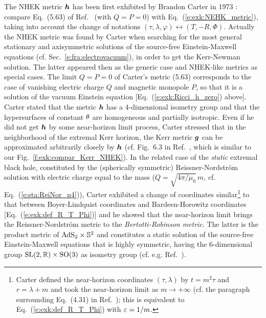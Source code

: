 \begin{hist} \label{h:exk:NHEK_metric}
The NHEK metric $\bm{h}$ has been first exhibited by Brandon Carter in 1973 \cite{Carte73a}:
compare Eq.~(5.63) of Ref.~\cite{Carte73a} (with $Q=P=0$) with Eq.~(\ref{e:exk:NEHK_metric}),
taking into account the change of notations $(\tau,\lambda,\varphi) \leftrightarrow (T,-R,\Phi)$.
Actually the NHEK metric was found by Carter when searching for the most general stationary
and axisymmetric solutions of the source-free Einstein-Maxwell equations (cf. Sec.~\ref{e:fra:electrovacuum}), in order to get
the Kerr-Newman solution. The latter appeared then as the generic case and NHEK-like metrics as
special cases. The limit $Q=P=0$ of Carter's metric (5.63) corresponds to the case
of vanishing electric charge $Q$ and magnetic monopole $P$, so that it is a solution
of the vacuum Einstein equation  [Eq.~(\ref{e:exk:Ricci_h_zero}) above].
Carter stated that the metric $\bm{h}$ has a
4-dimensional isometry group and that the hypersurfaces of constant $\theta$ are
homogeneous and partially isotropic.
Even if he did not get $\bm{h}$ by some near-horizon limit process,
Carter stressed that in the neighborhood of the extremal Kerr horizon,
the Kerr metric $\bm{g}$ can
be approximated arbitrarily closely by $\bm{h}$
(cf. Fig.~6.3 in Ref.~\cite{Carte73a}, which is similar to our Fig.~\ref{f:exk:compar_Kerr_NHEK}).
In the related case of the \emph{static} extremal black hole,
constituted by the (spherically symmetric)
Reissner-Nordström solution
with electric charge equal to the mass ($Q = \sqrt{4\pi/\mu_0}\,m$, cf. Eq.~(\ref{e:sta:ReiNor_n4})), Carter exhibited
a change of coordinates similar\footnote{Carter defined the near-horizon coordinates
$(\tau,\lambda)$ by $t = m^2 \tau$ and $r = \lambda + m$ and took the
near-horizon limit as $m\to +\infty$
(cf. the paragraph surrounding Eq.~(4.31) in Ref.~\cite{Carte73a});
this is equivalent to Eq.~(\ref{e:exk:def_R_T_Phi})
with $\varepsilon = 1/m$.}
to that between Boyer-Lindquist coordinates
and Bardeen-Horowitz coordinates [Eq.~(\ref{e:exk:def_R_T_Phi})] and
he showed that the near-horizon limit brings
the Reissner-Nordström metric to the
\emph{Bertotti-Robinson metric}.
The latter is the product metric of $\mathrm{AdS}_2\times\mathbb{S}^2$ and constitutes a static solution of
the source-free Einstein-Maxwell equations that is highly symmetric, having the 6-dimensional
group $\mathrm{SL}(2,\mathbb{R})\times\mathrm{SO}(3)$ as isometry group (cf. e.g. Ref.~\cite{GarfiG11}).

\end{hist}
